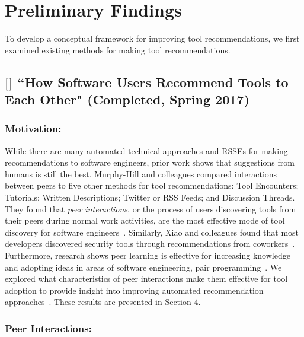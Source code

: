 \section{Preliminary Findings}
 
To develop a conceptual framework for improving tool recommendations, we first examined existing methods for making tool recommendations.

\subsection{[\peer] ``How Software Users Recommend Tools to Each Other" (Completed, Spring 2017)}

\subsubsection{Motivation:}


While there are many automated technical approaches and RSSEs for making recommendations to software engineers, prior work shows that suggestions from humans is still the best. Murphy-Hill and colleagues compared interactions between peers to five other methods for tool recommendations: Tool Encounters; Tutorials; Written Descriptions; Twitter or RSS Feeds; and Discussion Threads. They found that \textit{peer interactions}, or the process of users discovering tools from their peers during normal work activities, are the most effective mode of tool discovery for software engineers~\cite{Murphy-Hill2011PeerInteraction,Murphy-Hill2015HowDoUsers}. Similarly, Xiao and colleagues found that most developers discovered security tools through recommendations from coworkers~\cite{Xiao2014Security}. Furthermore, research shows peer learning is effective for increasing knowledge and adopting ideas in areas of software engineering, pair programming~\cite{WilliamsPairProgramming}. We explored what characteristics of peer interactions make them effective for tool adoption to provide insight into improving automated recommendation approaches~\cite{VLHCC}. These results are presented in Section 4.

\subsubsection{Peer Interactions:}

